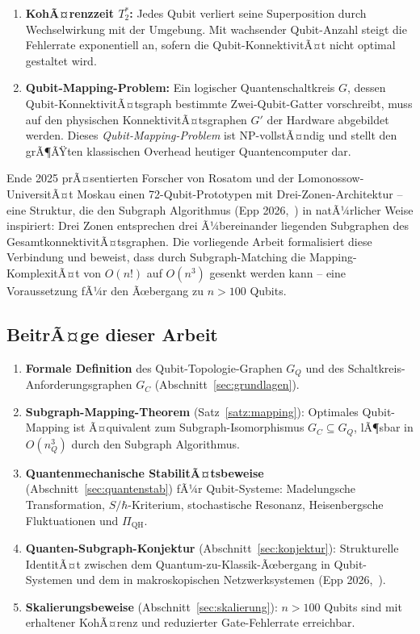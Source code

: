 ﻿\documentclass[a4paper,12pt]{article}
\theoremstyle{definition}
\begin{document}
\begin{enumerate}
\item \textbf{KohÃ¤renzzeit $T_2^*$:} Jedes Qubit verliert seine Superposition durch
  Wechselwirkung mit der Umgebung. Mit wachsender Qubit-Anzahl steigt die Fehlerrate
  exponentiell an, sofern die Qubit-KonnektivitÃ¤t nicht optimal gestaltet wird.

\item \textbf{Qubit-Mapping-Problem:} Ein logischer Quantenschaltkreis $G$, dessen
  Qubit-KonnektivitÃ¤tsgraph bestimmte Zwei-Qubit-Gatter vorschreibt, muss auf den
  physischen KonnektivitÃ¤tsgraphen $G'$ der Hardware abgebildet werden. Dieses
  \emph{Qubit-Mapping-Problem} ist NP-vollstÃ¤ndig und stellt den grÃ¶ÃŸten klassischen
  Overhead heutiger Quantencomputer dar.
\end{enumerate}

Ende 2025 prÃ¤sentierten Forscher von Rosatom und der Lomonossow-UniversitÃ¤t Moskau einen
72-Qubit-Prototypen mit Drei-Zonen-Architektur -- eine Struktur, die den Subgraph
Algorithmus (Epp 2026,~\cite{epp2026subgraph}) in natÃ¼rlicher Weise inspiriert: Drei
Zonen entsprechen drei Ã¼bereinander liegenden Subgraphen des GesamtkonnektivitÃ¤tsgraphen.
Die vorliegende Arbeit formalisiert diese Verbindung und beweist, dass durch
Subgraph-Matching die Mapping-KomplexitÃ¤t von $O(n!)$ auf $O(n^3)$ gesenkt werden kann
-- eine Voraussetzung fÃ¼r den Ãœbergang zu $n > 100$ Qubits.

\subsection{BeitrÃ¤ge dieser Arbeit}

\begin{enumerate}
\item \textbf{Formale Definition} des Qubit-Topologie-Graphen $G_Q$ und des
  Schaltkreis-Anforderungsgraphen $G_C$ (Abschnitt~\ref{sec:grundlagen}).

\item \textbf{Subgraph-Mapping-Theorem} (Satz~\ref{satz:mapping}): Optimales
  Qubit-Mapping ist Ã¤quivalent zum Subgraph-Isomorphismus $G_C \subseteq G_Q$,
  lÃ¶sbar in $O(n_Q^3)$ durch den Subgraph Algorithmus.

\item \textbf{Quantenmechanische StabilitÃ¤tsbeweise} (Abschnitt~\ref{sec:quantenstab})
  fÃ¼r Qubit-Systeme: Madelungsche Transformation, $S/\hbar$-Kriterium,
  stochastische Resonanz, Heisenbergsche Fluktuationen und $\Pi_\mathrm{QH}$.

\item \textbf{Quanten-Subgraph-Konjektur} (Abschnitt~\ref{sec:konjektur}):
  Strukturelle IdentitÃ¤t zwischen dem Quantum-zu-Klassik-Ãœbergang in Qubit-Systemen
  und dem in makroskopischen Netzwerksystemen (Epp 2026,~\cite{epp2026cnyn}).

\item \textbf{Skalierungsbeweise} (Abschnitt~\ref{sec:skalierung}): $n > 100$ Qubits
  sind mit erhaltener KohÃ¤renz und reduzierter Gate-Fehlerrate erreichbar.
\end{enumerate}
\end{document}

